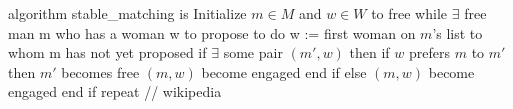 algorithm stable_matching is
    Initialize $m \in M$ and $w \in W$ to free
    while $\exists$ free man m who has a woman w to propose to do
        w := first woman on $m$'s list to whom m has not yet proposed
        if $\exists$ some pair $(m', w)$ then
            if $w$ prefers $m$ to $m'$ then
                $m'$ becomes free
                $(m, w)$ become engaged
            end if
        else
            $(m, w)$ become engaged
        end if
    repeat // wikipedia
